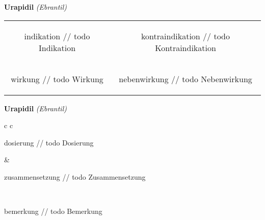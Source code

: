 \documentclass[12pt]{beamer}
\begin{document}
\begin{frame}{
    \textbf{Urapidil}
    \textit{(Ebrantil)}
}
    \begin{tabular}{c c}
        \begin{beamercolorbox}[wd=\boxwidth\textwidth,ht=\boxheight\textheight,sep=1em]{indikation}
        // todo Indikation
        \end{beamercolorbox} & 
        \begin{beamercolorbox}[wd=\boxwidth\textwidth,ht=\boxheight\textheight,sep=1em]{kontraindikation}
        // todo Kontraindikation 
        \end{beamercolorbox} \\
        \begin{beamercolorbox}[wd=\boxwidth\textwidth,ht=\boxheight\textheight,sep=1em]{wirkung}
        // todo Wirkung
        \end{beamercolorbox} & 
        \begin{beamercolorbox}[wd=\boxwidth\textwidth,ht=\boxheight\textheight,sep=1em]{nebenwirkung}
        // todo Nebenwirkung
        \end{beamercolorbox} \\
    \end{tabular}
\end{frame}

\begin{frame}{
    \textbf{Urapidil}
    \textit{(Ebrantil)}
}
    \begin{tabular}{c c}
        \begin{beamercolorbox}[wd=\boxwidth\textwidth,ht=\boxheight\textheight,sep=1em]{dosierung}
        // todo Dosierung
        \end{beamercolorbox} & 
        \begin{beamercolorbox}[wd=\boxwidth\textwidth,ht=\boxheight\textheight,sep=1em]{zusammensetzung}
        // todo Zusammensetzung
        \end{beamercolorbox} \\
        \begin{beamercolorbox}[wd=\textwidth,ht=\boxheight\textheight,sep=1em]{bemerkung}
        // todo Bemerkung
        \end{beamercolorbox} \\
    \end{tabular}
\end{frame}
\end{document}
